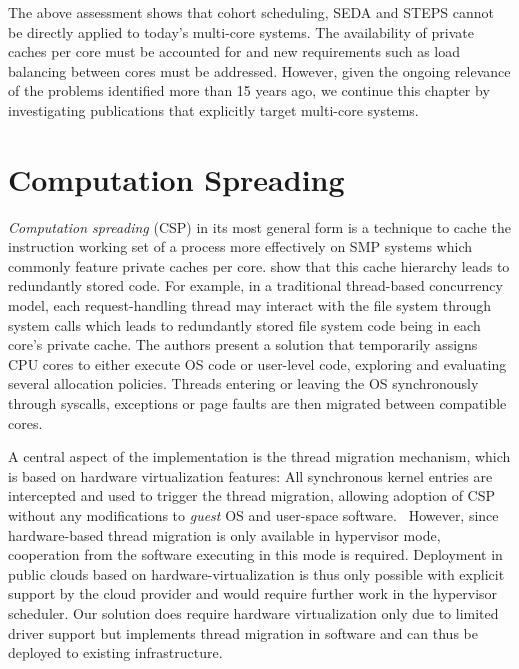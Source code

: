 \documentclass[12pt,a4paper]{book}
\begin{document}
The above assessment shows that cohort scheduling, SEDA and STEPS cannot be directly applied to today's multi-core systems.
The availability of private caches per core must be accounted for and new requirements such as load balancing between cores must be addressed.
However, given the ongoing relevance of the problems identified more than 15 years ago, we continue this chapter by investigating publications that explicitly target multi-core systems.

\section{Computation Spreading}\label{ch:relwork:compspr}
\emph{Computation spreading} (CSP) in its most general form is a technique to cache the instruction working set of a process more effectively on SMP systems which commonly feature private caches per core.
\citeauthor*{compspr} show that this cache hierarchy leads to redundantly stored code.
For example, in a traditional thread-based concurrency model, each request-handling thread may interact with the file system through system calls which leads to redundantly stored file system code being in each core's private cache.
The authors present a solution that temporarily assigns CPU cores to either execute OS code or user-level code, exploring and evaluating several allocation policies.
Threads entering or leaving the OS synchronously through syscalls, exceptions or page faults are then migrated between compatible cores.~\cite{compspr}

A central aspect of the implementation is the thread migration mechanism, which is based on hardware virtualization features:
All synchronous kernel entries are intercepted and used to trigger the thread migration,  allowing adoption of CSP without any modifications to \textit{guest} OS and user-space software.~\cite{compspr}
However, since hardware-based thread migration is only available in hypervisor mode, cooperation from the software executing in this mode is required.
Deployment in public clouds based on hardware-virtualization is thus only possible with explicit support by the cloud provider and would require further work in the hypervisor scheduler.
Our solution does require hardware virtualization only due to limited driver support but implements thread migration in software and can thus be deployed to existing infrastructure.
\end{document}
